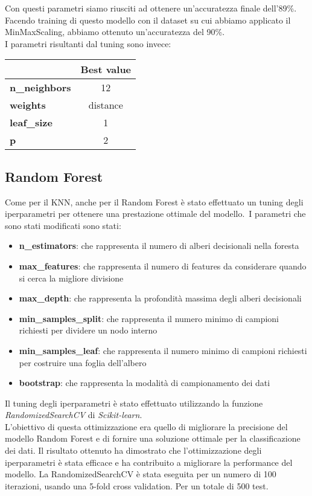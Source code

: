\documentclass[../../Report.tex]{subfiles}
\begin{document}
Con questi parametri siamo riusciti ad ottenere un'accuratezza finale dell'89\%.\\
Facendo training di questo modello con il dataset su cui abbiamo applicato il MinMaxScaling, abbiamo ottenuto un'accuratezza del 90\%.\\
I parametri risultanti dal tuning sono invece:
\begin{table}[H]
    \centering
    \begin{tabular}{|l|c|}
        \hline
         & \textbf{Best value} \\
        \hline
        \textbf{n\_neighbors} & 12 \\
        \hline
        \textbf{weights} & distance \\
        \hline
        \textbf{leaf\_size} & 1 \\
        \hline
        \textbf{p} & 2 \\
        \hline
    \end{tabular}
\end{table}

\subsection{Random Forest}
Come per il KNN, anche per il Random Forest è stato effettuato un tuning degli iperparametri per ottenere una prestazione ottimale del modello.\
I parametri che sono stati modificati sono stati:
\begin{itemize}
\item \textbf{n\_estimators}: che rappresenta il numero di alberi decisionali nella foresta
\item \textbf{max\_features}: che rappresenta il numero di features da considerare quando si cerca la migliore divisione
\item \textbf{max\_depth}: che rappresenta la profondità massima degli alberi decisionali
\item \textbf{min\_samples\_split}: che rappresenta il numero minimo di campioni richiesti per dividere un nodo interno
\item \textbf{min\_samples\_leaf}: che rappresenta il numero minimo di campioni richiesti per costruire una foglia dell'albero
\item \textbf{bootstrap}: che rappresenta la modalità di campionamento dei dati
\end{itemize}
Il tuning degli iperparametri è stato effettuato utilizzando la funzione \emph{RandomizedSearchCV} di \emph{Scikit-learn}.\\
L'obiettivo di questa ottimizzazione era quello di migliorare la precisione del modello Random Forest e di fornire una soluzione ottimale per la classificazione dei dati. Il risultato ottenuto ha dimostrato che l'ottimizzazione degli iperparametri è stata efficace e ha contribuito a migliorare la performance del modello. La RandomizedSearchCV è stata eseguita per un numero di 100 iterazioni, usando una 5-fold cross validation. Per un totale di 500 test. 
\end{document}
